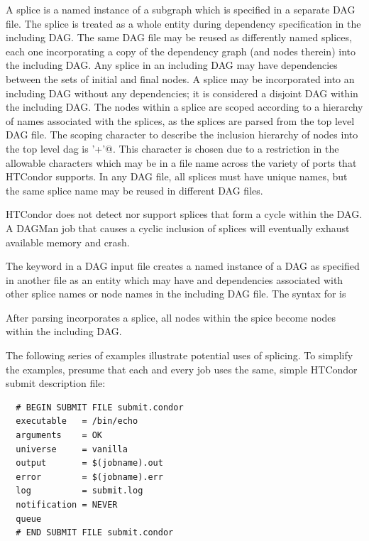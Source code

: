 A splice is a named instance of a subgraph which is specified in a
separate DAG file.
The splice is treated as a whole entity during dependency
specification in the including DAG.
The same DAG file may be reused as differently named splices,
each one
incorporating a copy of the dependency graph (and nodes therein) into the
including DAG. 
Any splice in an including DAG may have dependencies
between the sets of initial and final nodes.
A splice may be incorporated into an including DAG without any
dependencies; it is considered
a disjoint DAG within the including DAG.
The nodes within a splice are scoped according to
a hierarchy of names associated with the splices,
as the splices are parsed from the top level DAG file.
The scoping character to describe the
inclusion hierarchy of nodes into the top level dag is 
\verb@'+'@.
This character is chosen due
to a restriction in the allowable characters which may be in a file name
across the variety of ports that HTCondor supports.
In any DAG file, all splices must have unique names,
but the same splice name may be reused in different DAG files.

HTCondor does not detect nor support splices that form a cycle
within the DAG.
A DAGMan job that causes a cyclic inclusion of splices will
eventually exhaust available memory and crash.

The  keyword in a DAG input file
creates a named instance of a DAG as specified
in another file as an entity which may have  and 
dependencies associated with other splice names or node names in the
including DAG file.
The syntax for  is

   

After parsing incorporates a splice,
all nodes within the spice become nodes within the including DAG.


The following series of examples illustrate potential uses of
splicing. To simplify the examples,
presume that each and every job uses the same,
simple HTCondor submit description file:

\begin{verbatim}
  # BEGIN SUBMIT FILE submit.condor
  executable   = /bin/echo
  arguments    = OK
  universe     = vanilla
  output       = $(jobname).out
  error        = $(jobname).err
  log          = submit.log
  notification = NEVER
  queue
  # END SUBMIT FILE submit.condor
\end{verbatim}

